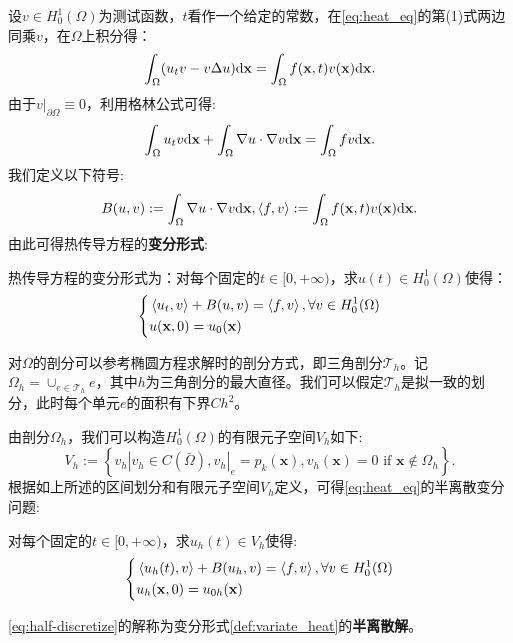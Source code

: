 设$v\in H_{0}^{1}(\Omega)$为测试函数，$t$看作一个给定的常数，在\eqref{eq:heat_eq}的第(1)式两边同乘$v$，在$\Omega$上积分得：
\begin{equation}
    \label{eq:int_test}
    \int_{\Omega}(u_{t}v-v\Delta u)\mathrm{d}\mathbf{x}=\int_{\Omega}f(\mathbf{x},t)v(\mathbf{x})\mathrm{d}\mathbf{x}.
\end{equation}
由于$v|_{\partial\Omega}\equiv 0$，利用格林公式可得:
\begin{equation}
    \int_{\Omega}u_{t}v\mathrm{d}\mathbf{x}+\int_{\Omega}\nabla u\cdot\nabla v\mathrm{d}\mathbf{x}=\int_{\Omega}fv\mathrm{d}\mathbf{x}.
\end{equation}
我们定义以下符号:
\begin{equation}
    B(u,v):=\int_{\Omega}\nabla u\cdot\nabla v\mathrm{d}\mathbf{x},\left<f,v\right>:=\int_{\Omega}f(\mathbf{x},t)v(\mathbf{x})\mathrm{d}\mathbf{x}.
\end{equation}
由此可得热传导方程的\textbf{变分形式}:
\begin{definition}
    \label{def:variate_heat}
    热传导方程的变分形式为：对每个固定的$t\in[0,+\infty)$，求$u(t)\in H_{0}^{1}(\Omega)$使得：
    \begin{equation}
        \left\{
            \begin{aligned}
                &\left<u_{t},v\right>+B(u,v)=\left<f,v\right>,\forall v\in H_{0}^{1}(\Omega)\\
                &u(\mathbf{x},0)=u_{0}(\mathbf{x})\\
            \end{aligned}
        \right.
    \end{equation}
\end{definition}
对$\Omega$的剖分可以参考椭圆方程求解时的剖分方式，即三角剖分$\mathcal{T}_{h}$。记$\Omega_{h}=\cup_{e\in\mathcal{T}_{h}}e$，其中$h$为三角剖分的最大直径。我们可以假定$\mathcal{T}_{h}$是拟一致的划分，此时每个单元$e$的面积有下界$Ch^{2}$。

由剖分$\Omega_{h}$，我们可以构造$H_{0}^{1}(\Omega)$的有限元子空间$V_{h}$如下:
\begin{equation}
    V_{h}:=\left\{v_{h}|v_{h}\in C(\bar\Omega),v_{h}|_{e}=p_{k}(\mathbf{x}),v_{h}(\mathbf{x})=0\text{ if }\mathbf{x}\notin\Omega_{h}\right\}.
\end{equation}
根据如上所述的区间划分和有限元子空间$V_{h}$定义，可得\eqref{eq:heat_eq}的半离散变分问题:
\begin{definition}
    \label{def:half-discretize_variate}
    对每个固定的$t\in [0,+\infty)$，求$u_{h}(t)\in V_{h}$使得:
    \begin{equation}
        \label{eq:half-discretize}
        \left\{
            \begin{aligned}
                &\left<u_{h}(t),v\right>+B(u_{h},v)=\left<f,v\right>,\forall v\in H_{0}^{1}(\Omega)\\
                &u_{h}(\mathbf{x},0)=u_{0h}(\mathbf{x})\\
            \end{aligned}
        \right.        
    \end{equation}
\end{definition}
\eqref{eq:half-discretize}的解称为变分形式\ref{def:variate_heat}的\textbf{半离散解}。 

